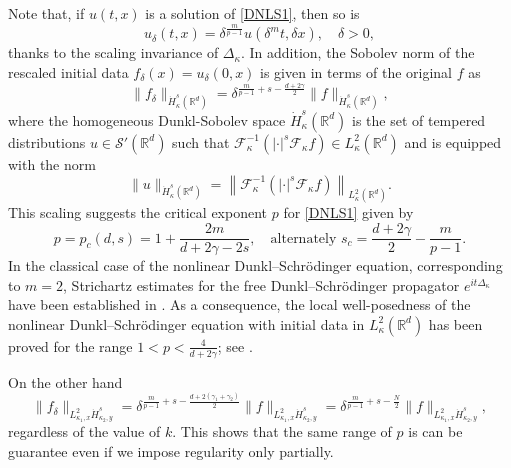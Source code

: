 \documentclass[a4paper,11pt, reqno]{amsart}
\theoremstyle{definition}
\theoremstyle{remark}
\numberwithin{equation}{section}
\newcommand{\K}{\kappa }
\begin{document}
	
	Note that,  if $u(t,x)$ is a solution of \eqref{DNLS1}, then so is
	\begin{equation*}
		u_{\delta}(t, x)= \delta^{\frac{m}{p-1}} u(\delta^{m} t, \delta x), \quad \delta>0,
	\end{equation*}
    thanks to the scaling invariance of $\Delta_\kappa.$
	In addition, the Sobolev norm of the rescaled initial data $f_{\delta}(x)=u_{\delta}(0, x)$ is given in terms of the original $f$ as 
	\begin{equation*}
		\| f_{\delta}\|_{\dot{H}_\kappa^s(\mathbb{R}^{d})} =\delta^{\frac{m}{p-1}+s-\frac{d+2\gamma}{2}} \|f\|_{ \dot{H}_{\kappa }^s(\mathbb{R}^{d})},
	\end{equation*}
    where the homogeneous Dunkl-Sobolev space $\dot{H}_\kappa^{s}\left(\mathbb{R}^{d}\right)$ is the set of tempered distributions $u \in \mathcal{S}'\left(\mathbb{R}^{d}\right)$ such that $\mathcal{F}^{-1}_\kappa\left(|\cdot|^s \mathcal{F}_\kappa f\right)\in L_\kappa^2\left(\mathbb{R}^{d}\right)$ and is equipped with the norm 
		\begin{equation*}
			\|u\|_{\dot{H}_\kappa^{s}\left(\mathbb{R}^{d}\right)}=\left\|\mathcal{F}^{-1}_\kappa\left(|\cdot|^s \mathcal{F}_\kappa f\right)\right\|_{L_\kappa^2\left(\mathbb{R}^{d}\right)}.
		\end{equation*}
This scaling suggests the critical exponent $p$ for \eqref{DNLS1}  given by
	\begin{equation*}
	    p=p_c(d, s)=1+\frac{2m}{d+2\gamma-2s}, \quad \text{alternately}\,\, s_c= \frac{d+2\gamma}{2}-\frac{m}{p-1}.
	\end{equation*}
    In the classical case of the nonlinear Dunkl–Schrödinger equation, corresponding to $m = 2$, Strichartz estimates for the free Dunkl–Schrödinger propagator $e^{it\Delta_\kappa}$ have been established in \cite{Mejjaoli2009, shyam}. As a consequence, the local well-posedness of the nonlinear Dunkl–Schrödinger equation with initial data in $L^2_\kappa(\mathbb{R}^d)$ has been proved for the range $1 < p < \frac{4}{d + 2\gamma}$; see \cite{Mejjaoli2009}.

    


        
	On the other hand 
	$$\| f_{\delta}\|_{L_{\K_1,x}^2 \dot{H}_{\kappa_2 ,y}^s} =\delta^{\frac{m}{p-1}+s-\frac{d+2(\gamma_1+\gamma_2)}{2}} \|f\|_{L_{\K_1,x}^2 \dot{H}_{\kappa_2, y}^s}=\delta^{\frac{m}{p-1}+s-\frac{N}{2}} \|f\|_{L_{\K_1,x}^2 \dot{H}_{\kappa_2, y}^s},$$
regardless of the value of $k$. This shows that the same range of $p$ is can be guarantee even if we impose regularity only partially.
\end{document}
